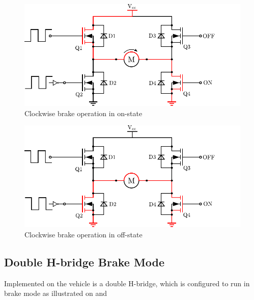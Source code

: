   \begin{minipage}{\linewidth}
  	\centering
  	\begin{minipage}{0.45\linewidth}
  		\begin{figure}[H]
  			\centering
  			\includegraphics[scale=.6]{figures/HbridgeClockwiseBrakeON.pdf}
  			\caption{Clockwise brake operation in on-state}
  			\label{HbridgeClockwiseBrakeON}
  		\end{figure}
  	\end{minipage}
  	\hspace{0.03\linewidth}
  	\begin{minipage}{0.45\linewidth}
  		\begin{figure}[H]
  			\centering
  			\includegraphics[scale=.6]{figures/HbridgeClockwiseBrakeOFF.pdf}
  			\caption{Clockwise brake operation in off-state}
  			\label{HbridgeClockwiseBrakeOFF}
  		\end{figure}
  	\end{minipage}
  \end{minipage}

\subsection{Double H-bridge Brake Mode}
Implemented on the vehicle is a double H-bridge, which is configured to run in brake mode as illustrated on  and 

